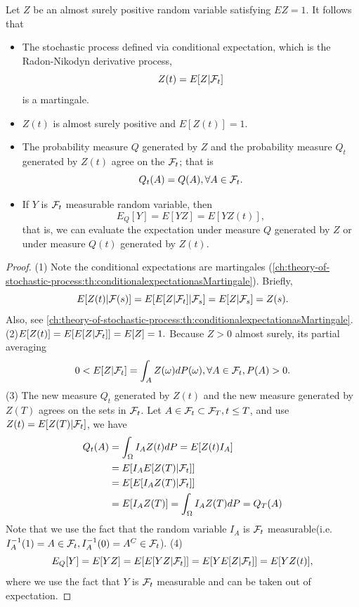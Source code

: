 \begin{refsection}
\begin{theorem}\cite[212]{shreve2004stochastic2}\label{ch:theory-of-stochastic-process:th:Radon-NikodynDerivativeProcessAppliedToChangeOfMeasure}
	Let $Z$ be an almost surely positive random variable satisfying $EZ = 1$. It follows that
	\begin{itemize}
		\item  The stochastic process defined via conditional expectation, which is the Radon-Nikodyn derivative process, 
		$$Z(t) = E[Z|\mathcal{F}_t]$$
		is a martingale.
		\item $Z(t)$ is almost surely positive and $E[Z(t)] = 1$.
		\item The probability measure $Q$ generated by $Z$ and the probability measure $Q_t$ generated by $Z(t)$ agree on the $\mathcal{F}_t$; that is
		$$Q_t(A) = Q(A), \forall A\in \mathcal{F}_t.$$
		\item If $Y$ is $\mathcal{F}_t$ measurable random variable, then
		$$E_Q[Y] = E[YZ] = E[YZ(t)],$$
		that is, we can evaluate the expectation under measure $Q$ generated by $Z$ or under measure $Q(t)$ generated by $Z(t)$.
	\end{itemize}
\end{theorem}
\begin{proof}
	(1) Note the conditional expectations are martingales (\autoref{ch:theory-of-stochastic-process:th:conditionalexpectationasMartingale}). Briefly,
	$$E[Z(t)|\mathcal{F}(s)] = E[E[Z|\mathcal{F}_t]|\mathcal{F}_s] = E[Z|\mathcal{F}_s] = Z(s).$$
	Also, see \autoref{ch:theory-of-stochastic-process:th:conditionalexpectationasMartingale}.
	(2)$E[Z(t)] = E[E[Z|\mathcal{F}_t]] = E[Z] = 1.$ Because $Z > 0$ almost surely, its partial averaging $$0< E[Z|\mathcal{F}_t] = \int_{A} Z(\omega)dP(\omega), \forall A\in \mathcal{F}_t, P(A) > 0.$$
	(3) The new measure $Q_t$ generated by $Z(t)$ and the new measure generated by $Z(T)$ agrees on the sets in $\mathcal{F}_t$.
	Let $A \in \mathcal{F}_t \subset \mathcal{F}_T, t\leq T$,  and use $Z(t) = E[Z(T)|\mathcal{F}_t]$, we have
	\begin{align*}
	Q_t(A) &= \int_{\Omega} I_A Z(t)dP = E[Z(t)I_A] \\
	&= E[I_A E[Z(T)|\mathcal{F}_t]] \\
	&= E[E[I_AZ(T)|\mathcal{F}_t]]\\
	&= E[I_AZ(T)] = \int_{\Omega}I_A Z(T)dP = Q_T(A)
	\end{align*}
	Note that we use the fact that the random variable $I_A$ is $\mathcal{F}_t$ measurable(i.e. $I_A^{-1}(1) = A \in \mathcal{F}_t, I_A^{-1}(0) = A^C \in \mathcal{F}_t$).
	(4)
	$$E_Q[Y] = E[YZ] = E[E[YZ|\mathcal{F}_t]] = E[YE[Z|\mathcal{F}_t]] = E[YZ(t)],$$
	where we use the fact that $Y$ is $\mathcal{F}_t$ measurable and can be taken out of expectation.
\end{proof}


\end{refsection}
